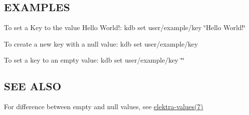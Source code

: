 \subsection*{E\+X\+A\+M\+P\+L\+E\+S}

To set a Key to the value {\ttfamily Hello World!}\+: {\ttfamily kdb set user/example/key \char`\"{}\+Hello World!\char`\"{}}

To create a new key with a null value\+: {\ttfamily kdb set user/example/key}

To set a key to an empty value\+: {\ttfamily kdb set user/example/key \char`\"{}\char`\"{}}

\subsection*{S\+E\+E A\+L\+S\+O}


\begin{DoxyItemize}
\item For difference between empty and null values, see \hyperlink{md_doc_help_elektra-values_doc_help_elektra-values_md}{elektra-\/values(7)} 
\end{DoxyItemize}